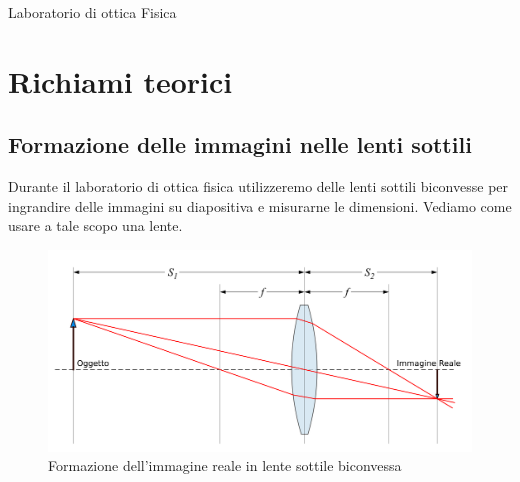 \documentclass[a4paper,10pt,oneside]{article}
\begin{document}
\begin{center}
{\huge Laboratorio di ottica Fisica}
\end{center}

\begin{abstract}
 In questo laboratorio studieremo i fenomeni di interferenza e diffrazione che evidenziano la natura ondulatoria della luce. Ci soffermeremo su gli esperimenti di interferenza per divisione del fronte d'onda (Young, Fresnel, Loyd etc.) e di diffrazione da ostruzioni circolari e rettangolari. 
\end{abstract}


\vspace{1.5cm}


\section*{Richiami teorici}



\subsection*{Formazione delle immagini nelle lenti sottili}

Durante il laboratorio di ottica fisica utilizzeremo delle lenti sottili biconvesse per ingrandire delle immagini su diapositiva e misurarne le dimensioni. Vediamo come usare a tale scopo una lente.

\begin{figure}[H]
 \centering
 \includegraphics[width=\textwidth]{./Immagini/Lens3.png}
 \caption{Formazione dell'immagine reale in lente sottile biconvessa}
 \label{fig:lenti_1}
\end{figure}
\end{document}
